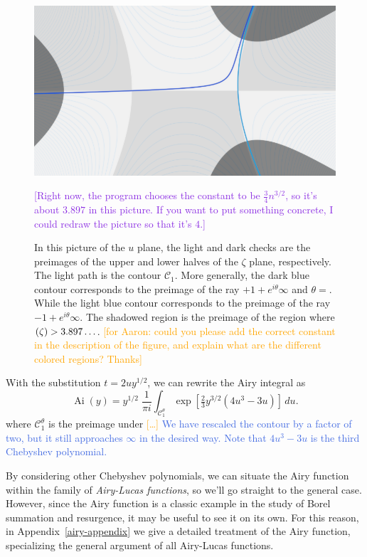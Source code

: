 \documentclass{article}
\let\Re\relax
\DeclareMathOperator{\Re}{Re}
\DeclareMathOperator{\Ai}{Ai}
\theoremstyle{definition}
\theoremstyle{plain}
\begin{document}
\begin{figure}[ht]
    \centering
    \includegraphics[scale=0.3]{figures/thimble_Airy.png}
    \caption{\small In this picture of the $u$ plane, the light and dark checks are the preimages of the upper and lower halves of the $\zeta$ plane, respectively. The light path is the contour $\mathcal{C}_1$. More generally, the dark blue contour corresponds to the preimage of the ray $+1+e^{i\theta}\infty$ and $\theta=$. While the light blue contour corresponds to the preimage of the ray $-1+e^{i\theta}\infty$. The shadowed region is the preimage of the region where $\Re(\zeta) > 3.897\ldots$. \textcolor{orange}{[for Aaron: could you please add the correct constant in the description of the figure, and explain what are the different colored regions? Thanks]}} \textcolor{BlueViolet}{[Right now, the program chooses the constant to be $\tfrac{3}{4} n^{3/2}$, so it's about $3.897$ in this picture. If you want to put something concrete, I could redraw the picture so that it's $4$.]}
    \label{fig:path_Airy}
\end{figure}


With the substitution $t = 2uy^{1/2}$, we can rewrite the Airy integral as
\[ \Ai(y) = y^{1/2}\;\frac{1}{\pi i} \int_{\mathcal{C}^\theta_1} \exp\left[\tfrac{2}{3}y^{3/2} \left(4u^3 - 3u\right)\right]\,du. \]
where $\mathcal{C}^\theta_1$ is the preimage under \textcolor{orange}{[\ldots]} \textcolor{RoyalBlue}{We have rescaled the contour by a factor of two, but it still approaches $\infty$ in the desired way. Note that $4u^3 - 3u$ is the third Chebyshev polynomial.}

By considering other Chebyshev polynomials, we can situate the Airy function within the family of {\em Airy-Lucas functions}, so we’ll go straight to the general case. However, since the Airy function is a classic example in the study of Borel summation and resurgence, it may be useful to see it on its own. For this reason, in Appendix~\ref{airy-appendix} we give a detailed treatment of the Airy function, specializing the general argument of all Airy-Lucas functions.
\end{document}
